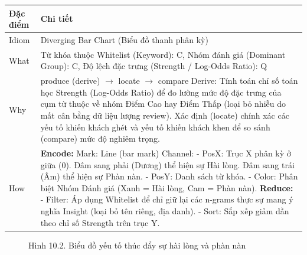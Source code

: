 \begin{longtable}{|p{2.8cm}|p{11.5cm}|}
\hline
\textbf{Đặc điểm} & \textbf{Chi tiết} \\
\hline
\endhead
\hline
\endfoot
Idiom & Diverging Bar Chart (Biểu đồ thanh phân kỳ) \\
\hline
What & Từ khóa thuộc Whitelist (Keyword): C, Nhóm đánh giá (Dominant Group): C, Độ lệch đặc trưng (Strength / Log-Odds Ratio): Q \\
\hline
Why & produce (derive) $\rightarrow$ locate $\rightarrow$ compare \newline
\newline
Derive: Tính toán chỉ số toán học Strength (Log-Odds Ratio) để đo lường mức độ đặc trưng của cụm từ thuộc về nhóm Điểm Cao hay Điểm Thấp (loại bỏ nhiễu do mất cân bằng dữ liệu lượng review). \newline
\newline
Xác định (locate) chính xác các yếu tố khiến khách ghét và yếu tố khiến khách khen để so sánh (compare) mức độ nghiêm trọng. \\
\hline
How & \textbf{Encode:} \newline
\newline
Mark: Line (bar mark) \newline
\newline
Channel: \newline
\newline
- PosX: Trục X phân kỳ ở giữa (0). Đâm sang phải (Dương) thể hiện sự Hài lòng. Đâm sang trái (Âm) thể hiện sự Phàn nàn. \newline
\newline
- PosY: Danh sách từ khóa. \newline
\newline
- Color: Phân biệt Nhóm Đánh giá (Xanh = Hài lòng, Cam = Phàn nàn). \newline
\newline
\textbf{Reduce:} \newline
\newline
- Filter: Áp dụng Whitelist để chỉ giữ lại các n-grams thực sự mang ý nghĩa Insight (loại bỏ tên riêng, địa danh). \newline
\newline
- Sort: Sắp xếp giảm dần theo chỉ số Strength trên trục Y. \\
\hline
\end{longtable}

\begin{figure}[H]
    \centering
    \caption{Hình 10.2. Biểu đồ yếu tố thúc đẩy sự hài lòng và phàn nàn}
    \label{fig:domain-task10-chart2}
\end{figure}

